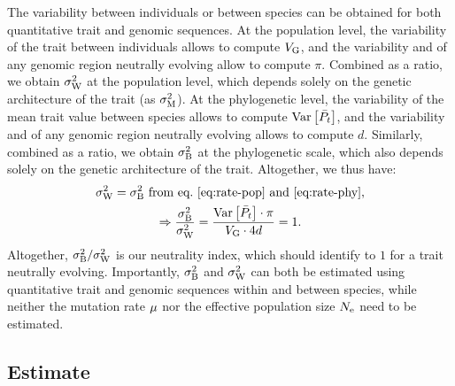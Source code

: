 \documentclass{article}
\begin{document}
 The variability between individuals or between species can be obtained for both quantitative trait and genomic sequences.
 At the population level, the variability of the trait between individuals allows to compute $V_{\mathrm{G}}$, and the variability and of any genomic region neutrally evolving allow to compute $\pi$.
Combined as a ratio, we obtain $\sigma^2_{\mathrm{W}}$ at the population level, which depends solely on the genetic architecture of the trait (as $\sigma^2_{\mathrm{M}}$).
At the phylogenetic level, the variability of the mean trait value between species allows to compute $\operatorname{\text{Var}} \left[\bar{P_{t}}\right]$, and the variability and of any genomic region neutrally evolving allows to compute $d$.
Similarly, combined as a ratio, we obtain $\sigma^2_{\mathrm{B}}$ at the phylogenetic scale, which also depends solely on the genetic architecture of the trait.
Altogether, we thus have:
\begin{gather}
    \sigma^2_{\mathrm{W}} = \sigma^2_{\mathrm{B}} \text{ from eq.~\ref{eq:rate-pop} and~\ref{eq:rate-phy}} , \\
    \Rightarrow \frac{\sigma^2_{\mathrm{B}}}{\sigma^2_{\mathrm{W}}} = \frac{\operatorname{\text{Var}} \left[\bar{P_{t}}\right] \cdot \pi}{ V_{\mathrm{G}} \cdot 4 d }  = 1.
\end{gather}
Altogether, $\sigma^2_{\mathrm{B}} / \sigma^2_{\mathrm{W}}$ is our neutrality index, which should identify to $1$ for a trait neutrally evolving.
Importantly, $\sigma^2_{\mathrm{B}}$ and $\sigma^2_{\mathrm{W}}$ can both be estimated using quantitative trait and genomic sequences within and between species, while neither the mutation rate $\mu$ nor the effective population size $N_{\text{e}}$ need to be estimated.

\subsection{Estimate}
\end{document}
